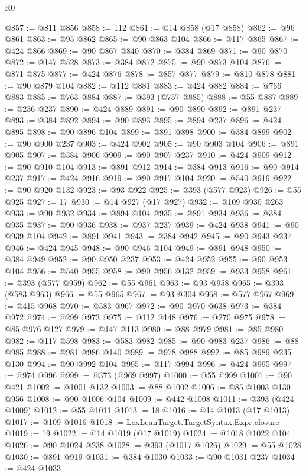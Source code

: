 \begin{lexlean}{R0}
\begin{coremodule}
@857 := @811 @856
@858 := 112
@861 := @14 @858 (@17 @858)
@862 := @96 @861
@863 := @95 @862
@865 := @90 @863 @104
@866 := @117 @865
@867 := @424 @866
@869 := @90 @867 @840
@870 := @384 @869
@871 := @90 @870
@872 := @147 @528
@873 := @384 @872
@875 := @90 @873 @104
@876 := @871 @875
@877 := @424 @876
@878 := @857 @877
@879 := @810 @878
@881 := @90 @879 @104
@882 := @112 @881
@883 := @424 @882
@884 := @766 @883
@885 := @763 @884
@887 := @393 (@757 @885)
@888 := @55 @887
@889 := @236 @237
@890 := @424 @889
@891 := @90 @890
@892 := @891 @237
@893 := @384 @892
@894 := @90 @893
@895 := @894 @237
@896 := @424 @895
@898 := @90 @896 @104
@899 := @891 @898
@900 := @384 @899
@902 := @90 @900 @237
@903 := @424 @902
@905 := @90 @903 @104
@906 := @891 @905
@907 := @384 @906
@909 := @90 @907 @237
@910 := @424 @909
@912 := @90 @910 @104
@913 := @891 @912
@914 := @384 @913
@916 := @90 @914 @237
@917 := @424 @916
@919 := @90 @917 @104
@920 := @540 @919
@922 := @90 @920 @132
@923 := @93 @922
@925 := @393 (@577 @923)
@926 := @55 @925
@927 := 17
@930 := @14 @927 (@17 @927)
@932 := @109 @930 @263
@933 := @90 @932
@934 := @894 @104
@935 := @891 @934
@936 := @384 @935
@937 := @90 @936
@938 := @937 @237
@939 := @424 @938
@941 := @90 @939 @104
@942 := @891 @941
@943 := @384 @942
@945 := @90 @943 @237
@946 := @424 @945
@948 := @90 @946 @104
@949 := @891 @948
@950 := @384 @949
@952 := @90 @950 @237
@953 := @424 @952
@955 := @90 @953 @104
@956 := @540 @955
@958 := @90 @956 @132
@959 := @933 @958
@961 := @393 (@577 @959)
@962 := @55 @961
@963 := @93 @958
@965 := @393 (@583 @963)
@966 := @55 @965
@967 := @93 @304
@968 := @577 @967
@969 := @415 @968
@970 := @583 @967
@972 := @90 @970 @638
@973 := @384 @972
@974 := @299 @973
@975 := @112 @148
@976 := @270 @975
@978 := @85 @976 @127
@979 := @147 @113
@980 := @88 @979
@981 := @85 @980
@982 := @117 @598
@983 := @583 @982
@985 := @90 @983 @237
@986 := @88 @985
@988 := @981 @986 @140
@989 := @978 @988
@992 := @85 @989 @235 @130
@994 := @90 @992 @104
@995 := @117 @994
@996 := @424 @995
@997 := @974 @996
@999 := @373 (@969 @997)
@1000 := @55 @999
@1001 := @90 @421
@1002 := @1001 @132
@1003 := @88 @1002
@1006 := @85 @1003 @130 @956
@1008 := @90 @1006 @104
@1009 := @442 @1008
@1011 := @393 (@424 @1009)
@1012 := @55 @1011
@1013 := 18
@1016 := @14 @1013 (@17 @1013)
@1017 := @109 @1016
@1018 := LexLeanTarget.TargetSyntax.Expr.closure
@1019 := 19
@1022 := @14 @1019 (@17 @1019)
@1024 := @1018 @1022 @104
@1026 := @90 @1024 @238
@1028 := @393 (@1017 @1026)
@1029 := @55 @1028
@1030 := @891 @919
@1031 := @384 @1030
@1033 := @90 @1031 @237
@1034 := @424 @1033

\end{coremodule}
\end{lexlean}
